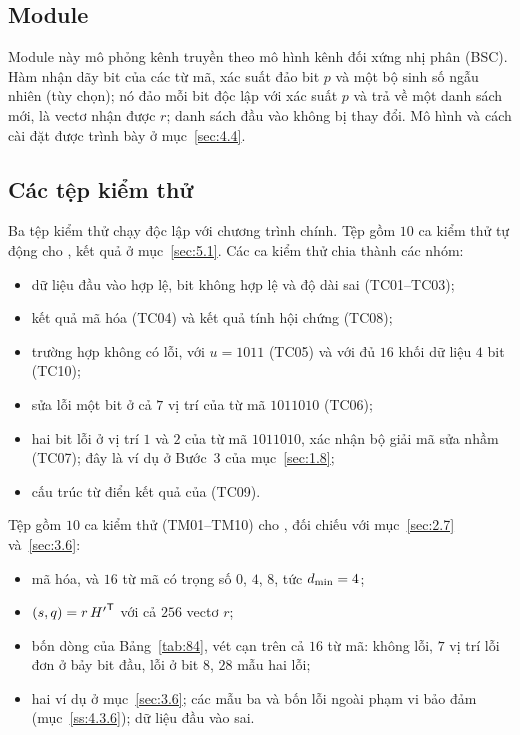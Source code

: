 \subsection{Module }
\label{ss:4.2.4}

Module này mô phỏng kênh truyền theo mô hình kênh đối xứng nhị phân (BSC). Hàm
 nhận dãy bit của các từ mã, xác suất đảo bit
$p$ và một bộ sinh số ngẫu nhiên (tùy chọn); nó đảo mỗi bit độc lập với xác suất
$p$ và trả về một danh sách mới, là vectơ nhận được $r$; danh sách đầu vào không
bị thay đổi. Mô hình và cách cài
đặt được trình bày ở mục~\ref{sec:4.4}.

\subsection{Các tệp kiểm thử}
\label{ss:4.2.5}

Ba tệp kiểm thử chạy độc lập với chương trình chính. Tệp
 gồm $10$ ca kiểm thử tự động cho , kết
quả ở mục~\ref{sec:5.1}. Các ca kiểm thử chia thành các nhóm:
\begin{itemize}
  \item dữ liệu đầu vào hợp lệ, bit không hợp lệ và độ dài sai (TC01--TC03);
  \item kết quả mã hóa (TC04) và kết quả tính hội chứng (TC08);
  \item trường hợp không có lỗi, với $u = 1011$ (TC05) và với đủ $16$ khối dữ
        liệu $4$ bit (TC10);
  \item sửa lỗi một bit ở cả $7$ vị trí của từ mã $1011010$ (TC06);
  \item hai bit lỗi ở vị trí $1$ và $2$ của từ mã $1011010$, xác nhận bộ giải
        mã sửa nhầm (TC07); đây là ví dụ ở Bước~3 của mục~\ref{sec:1.8};
  \item cấu trúc từ điển kết quả của  (TC09).
\end{itemize}

Tệp  gồm $10$ ca kiểm thử (TM01--TM10) cho
, đối chiếu với mục~\ref{sec:2.7} và~\ref{sec:3.6}:
\begin{itemize}
  \item mã hóa, và $16$ từ mã có trọng số $0$, $4$, $8$, tức $d_{\min} = 4$;
  \item $(s, q) = r\,{H'}^{\mathsf{T}}$ với cả $256$ vectơ $r$;
  \item bốn dòng của Bảng~\ref{tab:84}, vét cạn trên cả $16$ từ mã: không lỗi,
        $7$ vị trí lỗi đơn ở bảy bit đầu, lỗi ở bit $8$, $28$ mẫu hai lỗi;
  \item hai ví dụ ở mục~\ref{sec:3.6}; các mẫu ba và bốn lỗi ngoài phạm vi bảo
        đảm (mục~\ref{ss:4.3.6}); dữ liệu đầu vào sai.
\end{itemize}

